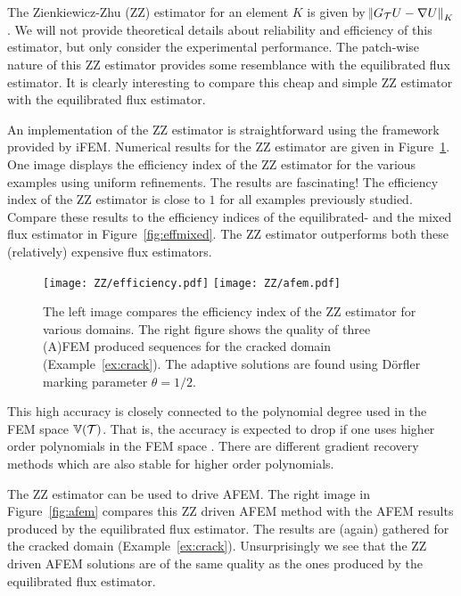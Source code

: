 \documentclass[thesis.tex]{subfiles}
\begin{document}
The Zienkiewicz-Zhu (ZZ) estimator for an element $K$ is given by $\norm{G_{\mathcal{T}} U - \nabla U}_K$. We will
not provide theoretical details about reliability and efficiency of this estimator, but only consider
the experimental performance. The patch-wise nature of this ZZ estimator provides
some resemblance with the equilibrated flux estimator.
It is clearly interesting to compare this cheap and simple ZZ estimator with the equilibrated flux estimator.

An implementation of the ZZ estimator is straightforward using the framework provided by iFEM. 
Numerical results for the ZZ estimator are given in Figure~\ref{fig:ZZ}.
One image displays the efficiency index of the ZZ estimator for the various examples using uniform refinements.
The results are fascinating! The efficiency index of the ZZ estimator is close to $1$ for all examples previously
studied. Compare these results to the efficiency indices of the equilibrated- and the mixed flux estimator in Figure~\ref{fig:effmixed}.
The ZZ estimator outperforms both these (relatively) expensive flux estimators. 
\begin{figure}
  \centering
  \texttt{[image: ZZ/efficiency.pdf]}
  \texttt{[image: ZZ/afem.pdf]}
  \caption{
    The left image compares the efficiency index of the ZZ estimator for various domains.
    The right figure shows the quality of three (A)FEM produced sequences for the cracked domain (Example~\ref{ex:crack}). The adaptive solutions are found using D\"orfler marking parameter $\theta = 1/2$.
  }
  \label{fig:ZZ}
\end{figure}

This high accuracy is closely
connected to the polynomial degree used in the FEM space $\mathbb{V}(\mathcal{T})$. That is, the accuracy
is expected to drop if one uses higher order polynomials in the FEM space \cite{bartels2002each}.
There are different gradient recovery methods which are also stable for higher order polynomials.

The ZZ estimator can be used to drive AFEM. The right image in Figure~\ref{fig:afem} compares this ZZ driven AFEM method
with the AFEM results produced by the equilibrated flux estimator. The results are (again) gathered for the cracked domain 
(Example~\ref{ex:crack}). Unsurprisingly we see that the ZZ driven AFEM solutions are of the same quality as the ones produced by the
equilibrated flux estimator. 
\end{document}
